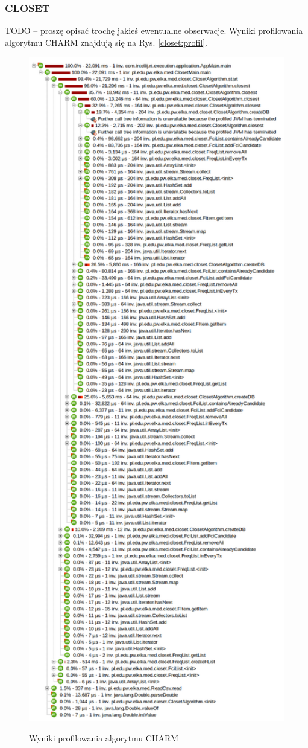 \subsubsection{CLOSET}

TODO -- proszę opisać trochę jakieś ewentualne obserwacje. Wyniki profilowania algorytmu CHARM znajdują się na Rys. \ref{closet:profil}.

\begin{figure}
\caption{Wyniki profilowania algorytmu CHARM}
\includegraphics[width=14cm]{res/closet-profi.png}
\label{charm:profil}
\end{figure}